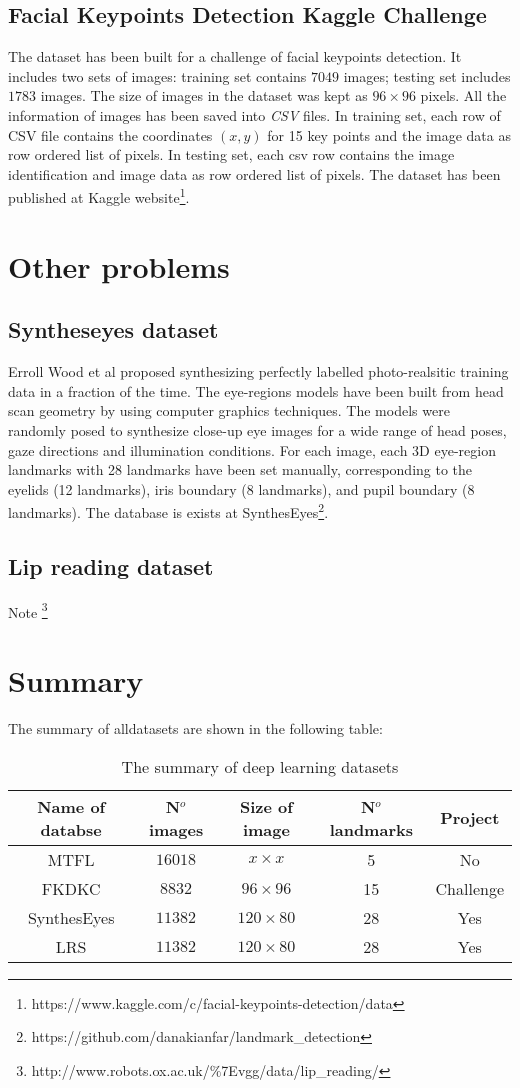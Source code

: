 \subsection{Facial Keypoints Detection Kaggle Challenge}
The dataset has been built for a challenge of facial keypoints detection. It includes two sets of images: training set contains $7049$ images; testing set includes $1783$ images. The size of images in the dataset was kept as $96 \times 96$ pixels. All the information of images has been saved into \textit{CSV} files. In training set, each row of CSV file contains the coordinates $(x,y)$ for 15 key points and the image data as row ordered list of pixels. In testing set, each csv row contains the image identification and image data as row ordered list of pixels. The dataset has been published at Kaggle website\footnote{https://www.kaggle.com/c/facial-keypoints-detection/data}.
\section{Other problems}
\subsection{Syntheseyes dataset}
Erroll Wood et al \cite{wood2015_iccv} proposed synthesizing perfectly labelled photo-realsitic training data in a fraction of the time. The eye-regions models have been built from head scan geometry by using computer graphics techniques. The models were randomly posed to synthesize close-up eye images for a wide range of head poses, gaze directions and illumination conditions. For each image, each 3D eye-region landmarks with 28 landmarks have been set manually, corresponding to the eyelids (12 landmarks), iris boundary (8 landmarks), and pupil boundary (8 landmarks).
The database is exists at SynthesEyes\footnote{https://github.com/danakianfar/landmark\_detection}.
\subsection{Lip reading dataset}
Note \footnote{http://www.robots.ox.ac.uk/$\%$7Evgg/data/lip\_reading/}
\section{Summary}
The summary of alldatasets are shown in the following table:\\
\begin{table}[!h]
	\centering
	\begin{tabular}{*{5}{c}}
		Name of databse & N$^{o}$ images & Size of image & N$^{o}$ landmarks & Project \\ \hline
		MTFL & $16018$ & $x \times x$ & 5 & No \\ \hline
		FKDKC & $8832$ & $96 \times 96$ & 15 & Challenge \\ \hline
		SynthesEyes & $11382$ & $120 \times 80$ & 28 & Yes \\ \hline
		LRS & $11382$ & $120 \times 80$ & 28 & Yes \\ \hline
	\end{tabular}
	\caption{The summary of deep learning datasets}
	\label{tb4}
\end{table}
